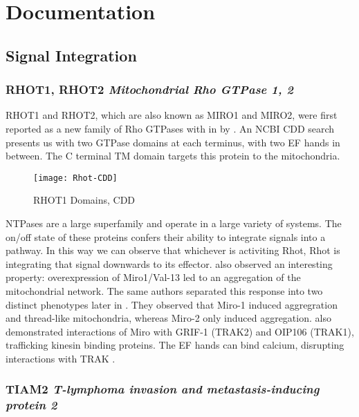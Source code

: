 \section{Documentation}

\subsection{Signal Integration}

\subsubsection{RHOT1, RHOT2 \textit{Mitochondrial Rho GTPase 1, 2}}

RHOT1 and RHOT2, which are also known as MIRO1 and MIRO2, were first reported as
a new family of Rho GTPases with in \citeyear{Fransson2003} by
\citeauthor{Fransson2003}. An NCBI CDD search presents us with two GTPase
domains at each terminus, with two EF hands in between. The C terminal TM domain
targets this protein to the mitochondria.

\begin{figure}[h!]
  \centering
    \texttt{[image: Rhot-CDD]}
  \caption{RHOT1 Domains, CDD}
\end{figure}

NTPases are a large superfamily and operate in a large variety of systems. The
on/off state of these proteins confers their ability to integrate signals into a
pathway. In this way we can observe that whichever is activiting Rhot, Rhot is
integrating that signal downwards to its effector. \citeauthor{Fransson2003}
also observed an interesting property: overexpression of Miro1/Val-13 led to
an aggregation of the mitochondrial network. The same authors separated this
response into two distinct phenotypes later in \citeyear{Fransson2006}. They
observed that Miro-1 induced aggregration and thread-like mitochondria, whereas
Miro-2 only induced aggregation. \citeauthor{Fransson2006} also demonstrated
interactions of Miro with GRIF-1 (TRAK2) and OIP106 (TRAK1), trafficking
kinesin binding proteins. The EF hands can bind calcium,
disrupting interactions with TRAK \citep{Reis2009}.


\subsubsection{TIAM2 \textit{T-lymphoma invasion and metastasis-inducing protein 2}}

